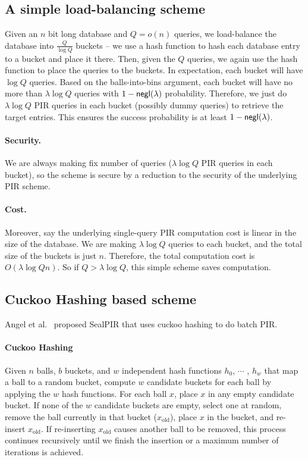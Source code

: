      
\subsection{A simple load-balancing scheme}

Given an $n$ bit long database and $Q=o(n)$ queries, we load-balance the database into $\frac{Q}{\log Q}$ buckets -- we use a hash function to hash each database entry to a bucket and place it there.
Then, given the $Q$ queries, we again use the hash function to place the queries to the buckets. 
In expectation, each bucket will have $\log Q$ queries. 
Based on the balls-into-bins argument, each bucket will have no more than $\lambda \log Q$ queries with $1-{\sf negl}(\lambda)$ probability.
Therefore, we just do $\lambda \log Q$ PIR queries in each bucket (possibly dummy queries) to retrieve the target entries. 
This ensures the success probability is at least $1-{\sf negl}(\lambda)$.

\paragraph{Security.}
We are always making fix number of queries ($\lambda \log Q$ PIR queries in each bucket), so the scheme is secure by a reduction to the security of the underlying PIR scheme.

\paragraph{Cost.}
Moreover, say the underlying single-query PIR computation cost is linear in the size of the database.
We are making $\lambda \log Q$ queries to each bucket, and the total size of the buckets is just $n$. 
Therefore, the total computation cost is $O(\lambda \log Q n)$. 
So if $Q>\lambda \log Q$, this simple scheme saves computation.


     
     
\subsection{Cuckoo Hashing based scheme~\cite{angel2018pir}}

Angel et al.~\cite{angel2018pir} proposed SealPIR that uses cuckoo hashing to do batch PIR.
    
    \paragraph{Cuckoo Hashing}
    \begin{definition}
        Given $n$ balls, $b$ buckets, and $w$
independent hash functions $h_0$, $\cdots$ , $h_{w}$ that map a ball to a
random bucket, compute $w$ candidate buckets for each ball by
applying the $w$ hash functions. For each ball $x$, place $x$ in any
empty candidate bucket. If none of the $w$ candidate buckets
are empty, select one at random, remove the ball currently in
that bucket ($x_{\text{old}}$), place $x$ in the bucket, and re-insert $x_{\text{old}}$. If
re-inserting $x_{\text{old}}$ causes another ball to be removed, this process
continues recursively until we finish the insertion or a maximum number of iterations is achieved.
    \end{definition} \
    
